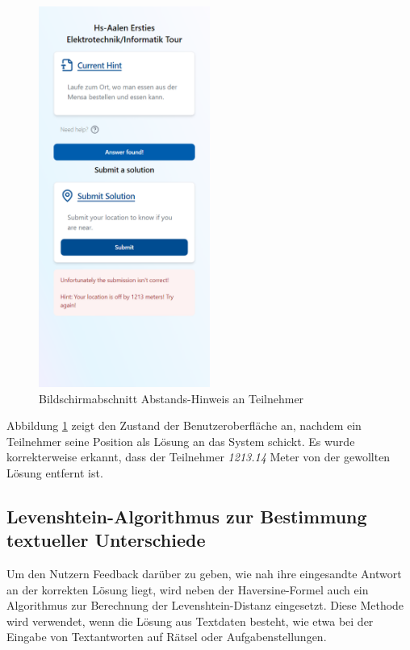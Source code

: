 \begin{figure}[H]
    \centering
    \includegraphics[width=0.5\textwidth]{images/PrAr_Impl_Geolocation-UI.png}
    \caption{Bildschirmabschnitt Abstands-Hinweis an Teilnehmer}
    \label{fig:implementierung:geolocation_ui}
\end{figure}

Abbildung \ref{fig:implementierung:geolocation_ui} zeigt den Zustand der Benutzeroberfläche an, nachdem ein Teilnehmer seine Position als Lösung an das System schickt. Es wurde korrekterweise erkannt, dass der Teilnehmer \textit{1213.14} Meter von der gewollten Lösung entfernt ist.

\subsection{Levenshtein-Algorithmus zur Bestimmung textueller Unterschiede}
Um den Nutzern Feedback darüber zu geben, wie nah ihre eingesandte Antwort an der korrekten Lösung liegt, wird neben der Haversine-Formel auch ein Algorithmus zur Berechnung der Levenshtein-Distanz eingesetzt. Diese Methode wird verwendet, wenn die Lösung aus Textdaten besteht, wie etwa bei der Eingabe von Textantworten auf Rätsel oder Aufgabenstellungen.

